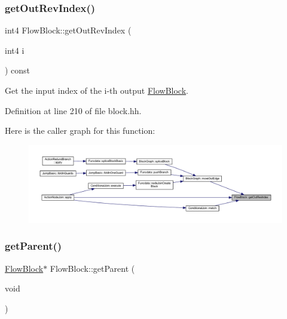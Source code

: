 \subsubsection{\texorpdfstring{getOutRevIndex()}{getOutRevIndex()}}
{\footnotesize\ttfamily int4 Flow\+Block\+::get\+Out\+Rev\+Index (\begin{DoxyParamCaption}\item[{int4}]{i }\end{DoxyParamCaption}) const\hspace{0.3cm}{\ttfamily [inline]}}



Get the input index of the i-\/th output \mbox{\hyperlink{class_flow_block}{Flow\+Block}}. 



Definition at line 210 of file block.\+hh.

Here is the caller graph for this function\+:
\nopagebreak
\begin{figure}[H]
\begin{center}
\leavevmode
\includegraphics[width=350pt]{class_flow_block_a7ebfd2366874120b2d582313386cc28f_icgraph}
\end{center}
\end{figure}
\mbox{\label{class_flow_block_aa09d7d958c190fa86a30dbe9ac23c78f}} 
\subsubsection{\texorpdfstring{getParent()}{getParent()}\hspace{0.1cm}{\footnotesize\ttfamily [1/2]}}
{\footnotesize\ttfamily \mbox{\hyperlink{class_flow_block}{Flow\+Block}}$\ast$ Flow\+Block\+::get\+Parent (\begin{DoxyParamCaption}\item[{void}]{ }\end{DoxyParamCaption})\hspace{0.3cm}{\ttfamily [inline]}}



